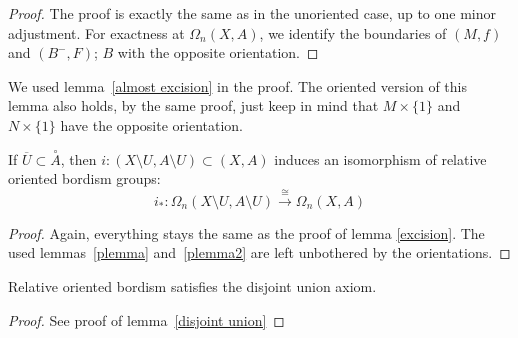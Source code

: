 \documentclass[a4paper,11pt]{article}
\begin{document}
\begin{proof}\cite{conner}
    The proof is exactly the same as in the unoriented case, up to one minor adjustment. For exactness at \(\Omega_n(X,A)\), we identify the boundaries of \((M,f)\) and \((B^-,F)\); \(B\) with the opposite orientation.
\begin{comment}
    \begin{itemize}
        \item \textbf{Exactness at \(\Omega_n(A)\)}: \(i_\ast\circ\partial=0\), as \((M,f)\) is a nullbordism for \(i_\ast\circ\partial(M,f)=\partial(M,f)\)\\
        For a nullbordism \((B,g)\) of \(M,f\), \(\partial(B,g)=(M,f)\).
        \item \textbf{Exactness at \(\Omega_n(X)\)}: 
        \(j_\ast\circ i_\ast=0\) exactly as in the unoriented case.

        \item \textbf{Exactness at \(\Omega_n(X,A)\)}: 
    \end{itemize}
\end{comment}
\end{proof}

\begin{remark}
    We used lemma\ \ref{almost excision} in the proof. The oriented version of this lemma also holds, by the same proof, just keep in mind that \(M\times\{1\}\) and \(N\times\{1\}\) have the opposite orientation.
\end{remark}

\begin{lemma}
    If \(\overline{U}\subset\overset{\circ}{A}\), then \(i:(X\setminus U, A\setminus U)\subset (X,A)\) induces an isomorphism of relative oriented bordism groups:
    \[i_\ast:\Omega_n(X\setminus U,A\setminus U)\xrightarrow{\cong}\Omega_n(X,A)\]
\end{lemma}

\begin{proof}\cite{conner}
    Again, everything stays the same as the proof of lemma \ref{excision}. The used lemmas\ \ref{plemma} and\ \ref{plemma2} are left unbothered by the orientations.
\end{proof}

\begin{lemma}
    Relative oriented bordism satisfies the disjoint union axiom.
\end{lemma}

\begin{proof}
    See proof of lemma\ \ref{disjoint union}
\end{proof}
\end{document}
